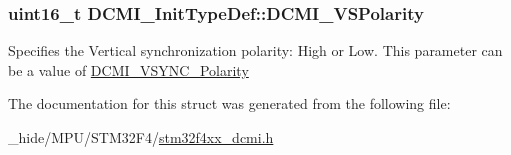 \subsubsection[{D\+C\+M\+I\+\_\+\+V\+S\+Polarity}]{\setlength{\rightskip}{0pt plus 5cm}uint16\+\_\+t D\+C\+M\+I\+\_\+\+Init\+Type\+Def\+::\+D\+C\+M\+I\+\_\+\+V\+S\+Polarity}\label{struct_d_c_m_i___init_type_def_aa14287a4d834253e11e0f8682c9596c5}
Specifies the Vertical synchronization polarity\+: High or Low. This parameter can be a value of \hyperlink{group___d_c_m_i___v_s_y_n_c___polarity}{D\+C\+M\+I\+\_\+\+V\+S\+Y\+N\+C\+\_\+\+Polarity} 

The documentation for this struct was generated from the following file\+:\begin{DoxyCompactItemize}
\item 
\+\_\+hide/\+M\+P\+U/\+S\+T\+M32\+F4/\hyperlink{stm32f4xx__dcmi_8h}{stm32f4xx\+\_\+dcmi.\+h}\end{DoxyCompactItemize}
